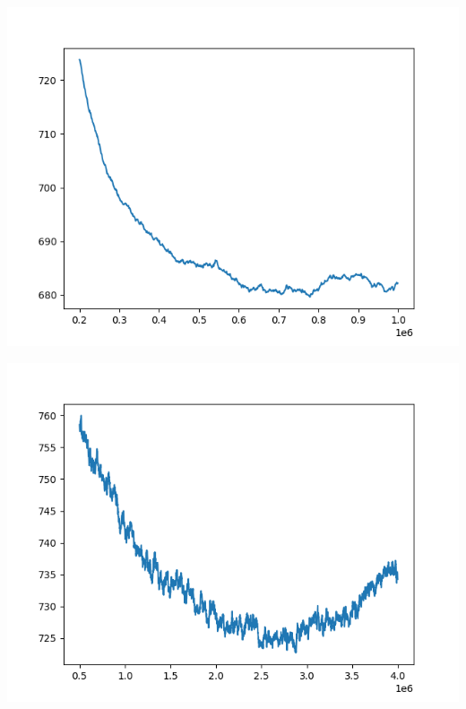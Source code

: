 \documentclass{article}
\begin{document}
\begin{enumerate}[label=\arabic*.]
\begin{minipage}{0.49\linewidth}
            \includegraphics[width=\linewidth]{../starter_code/figs/sgd_wo_k_70.png}
            \label{nobiasreg70}
        \end{minipage}\hfill
        \begin{minipage}{0.49\linewidth}
            \includegraphics[width=\linewidth]{../starter_code/figs/sgd_k70.png}
            \label{withbiasreg70}
        \end{minipage}\hfill
        \begin{minipage}{0.49\linewidth}

\end{minipage}
\end{enumerate}
\end{document}
